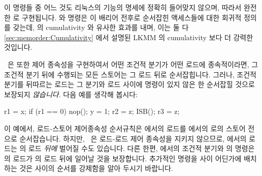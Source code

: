 이 명령들 중 어느 것도 리눅스의  기능의 명세에 정확히 들어맞지
않으며, 따라서 완전한  로 구현됩니다.
 와  명령은 이 배리어 전후로 순서잡힌 액세스들에 대한 회귀적
정의를 갖는데, \Power{} 의 cumulativity 와 유사한 효과를 내며, 이는 둘 다
\cref{sec:memorder:Cumulativity} 에서 설명된 LKMM 의 cumulativity 보다 더
강력한 것입니다.

\ARM\ 은 또한 제어 종속성을 구현하여서 어떤 조건적 분기가 어떤 로드에
종속적이라면, 그 조건적 분기 뒤에 수행되는 모든 스토어는 그 로드 뒤로
순서잡힙니다.
그러나, 조건적 분기를 뒤따르는 로드는 그 분기와 로드 사이에  명령이
있지 않은 한 순서잡힐 것으로 보장되지 \emph{않습니다}.
다음 예를 생각해 봅시다:

\begin{fcvlabel}
\begin{VerbatimN}[commandchars=\\\[\]]
r1 = x;			\lnlbl[x]
if (r1 == 0)		\lnlbl[if]
	nop();		\lnlbl[nop]
y = 1;			\lnlbl[y]
r2 = z;			\lnlbl[z1]
ISB();			\lnlbl[isb]
r3 = z;			\lnlbl[z2]
\end{VerbatimN}
\end{fcvlabel}

\begin{fcvref}
이 예에서, 로드-스토어 제어종속성 순서규칙은  에서의  로드를
 에서의  로의 스토어 전으로 순서잡습니다.
하지만, \ARM\ 은 로드-로드 제어 종속성을 지키지 않으므로,  에서의
로드는  의 로드 \emph{뒤에} 벌어질 수도 있습니다.
다른 한편,  에서의 조건적 분기와  의  명령은
 의 로드가  의 로드 뒤에 일어날 것을 보장합니다.
추가적인  명령을  사이 어딘가에 배치하는 것은
 사이의 순서를 강제함을 알아 두시기 바랍니다.
\end{fcvref}

